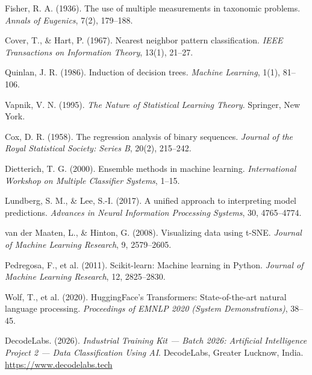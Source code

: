 \documentclass[12pt, a4paper]{report}
\begin{document}
\begin{enumerate}[leftmargin=*, label={[\arabic*]}, itemsep=6pt]

  \item \label{fisher1936}
        Fisher, R. A. (1936). The use of multiple measurements in taxonomic problems.
        \textit{Annals of Eugenics}, 7(2), 179--188.

  \item \label{cover1967}
        Cover, T., \& Hart, P. (1967). Nearest neighbor pattern classification.
        \textit{IEEE Transactions on Information Theory}, 13(1), 21--27.

  \item \label{quinlan1986}
        Quinlan, J. R. (1986). Induction of decision trees.
        \textit{Machine Learning}, 1(1), 81--106.

  \item \label{vapnik1995}
        Vapnik, V. N. (1995). \textit{The Nature of Statistical Learning Theory}.
        Springer, New York.

  \item \label{cox1958}
        Cox, D. R. (1958). The regression analysis of binary sequences.
        \textit{Journal of the Royal Statistical Society: Series B}, 20(2), 215--242.

  \item \label{dietterich2000}
        Dietterich, T. G. (2000). Ensemble methods in machine learning.
        \textit{International Workshop on Multiple Classifier Systems}, 1--15.

  \item \label{lundberg2017}
        Lundberg, S. M., \& Lee, S.-I. (2017). A unified approach to interpreting
        model predictions. \textit{Advances in Neural Information Processing Systems},
        30, 4765--4774.

  \item \label{maaten2008}
        van der Maaten, L., \& Hinton, G. (2008). Visualizing data using t-SNE.
        \textit{Journal of Machine Learning Research}, 9, 2579--2605.

  \item \label{pedregosa2011}
        Pedregosa, F., et al. (2011). Scikit-learn: Machine learning in Python.
        \textit{Journal of Machine Learning Research}, 12, 2825--2830.

  \item \label{wolf2020}
        Wolf, T., et al. (2020). HuggingFace's Transformers: State-of-the-art natural
        language processing. \textit{Proceedings of EMNLP 2020 (System Demonstrations)},
        38--45.

  \item \label{decodelabs2026}
        DecodeLabs. (2026). \textit{Industrial Training Kit — Batch 2026: Artificial
        Intelligence Project 2 — Data Classification Using AI}.
        DecodeLabs, Greater Lucknow, India. \url{https://www.decodelabs.tech}

\end{enumerate}
\end{document}
